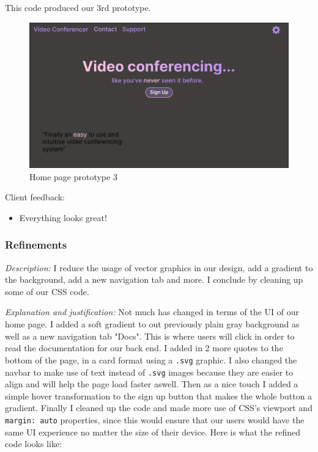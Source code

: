 This code produced our 3rd prototype.

\begin{figure}[H]
\centering

\includegraphics[scale=0.2]{Images/Proto_home3.png}

\caption{Home page prototype 3}
\end{figure}

{\color{gray} \hrulefill} \vspace{0.2cm}

{\sffamily Client feedback:}

\begin{itemize}
  \item Everything looks great!
\end{itemize}

{\color{gray} \hrulefill} 

\subsubsection{Refinements}

\textit{Description:}
I reduce the usage of vector graphics in our design,
add a gradient to the background, add a new navigation
tab and more. I conclude by cleaning up some of our CSS
code. \\ \vspace{0.2cm}

\textit{Explanation and justification:}
Not much has changed in terms of the UI of our home 
page. I added a soft gradient to out previously plain 
gray background as well as a new navigation tab "Docs".
This is where users will click in order to read the 
documentation for our back end. I added in 2 
more quotes to the bottom of the page, in a card 
format using a \texttt{.svg} graphic. I also changed 
the navbar to make use of text instead of 
\texttt{.svg} images because they are easier to align 
and will help the page load faster aswell. Then as a nice 
touch I added a simple hover transformation to the sign up 
button that makes the whole button a gradient. Finally I 
cleaned up the code and made more use of CSS's 
viewport and \texttt{margin: auto} properties, since
this would ensure that our users would have the same
UI experience no matter the size of their device. Here 
is what the refined code looks like: \\ \vspace{0.2cm}


